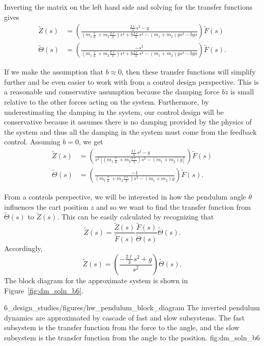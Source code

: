 %
Inverting the matrix on the left hand side and solving for the transfer functions gives
\begin{align*}
\tilde{Z}(s) &= \left(\frac{ \frac{2 \ell}{3} s^2 - g}{(m_1 \frac{\ell}{6}+ m_2 \frac{2 \ell}{3}) s^4 +b\frac{2\ell}{3} s^3 -(m_1+m_2)gs^2-bgs}\right) \tilde{F}(s) \\
\tilde{\Theta}(s) &= \left(\frac{-s^2}{(m_1 \frac{\ell}{6}+ m_2 \frac{2 \ell}{3}) s^4 +b\frac{2\ell}{3} s^3 -(m_1+m_2)gs^2-bgs}\right) \tilde{F}(s).
\end{align*}

If we make the assumption that $b \approx 0$, then these transfer functions will simplify further and be even easier to work with from a control design perspective. This is a reasonable and conservative assumption because the damping force $b\dot{z}$ is small relative to the other forces acting on the system. Furthermore, by underestimating the damping in the system, our control design will be conservative because it assumes there is no damping provided by the physics of the system and thus all the damping in the system must come from the feedback control.
%
Assuming $b=0$, we get
\begin{align*}
\tilde{Z}(s) &= \left(\frac{\frac{2 \ell}{3} s^2 - g}{s^2\left[(m_1 \frac{\ell}{6}+ m_2 \frac{2 \ell}{3}) s^2  -(m_1+m_2)g \right]}\right) \tilde{F}(s) \\
\tilde{\Theta}(s) &= \left(\frac{-1}{(m_1 \frac{\ell}{6}+ m_2 \frac{2 \ell}{3}) s^2  -(m_1+m_2)g}\right) \tilde{F}(s).
\end{align*}

From a controls perspective, we will be interested in how the pendulum angle $\theta$ influences the cart position $z$ and so we want to find the transfer function from $\tilde{\Theta}(s)$ to $\tilde{Z}(s)$. This can be easily calculated by recognizing that
\[
\tilde{Z}(s) = \frac{\tilde{Z}(s)}{\tilde{F}(s)}\frac{\tilde{F}(s)}{\tilde{\Theta}(s)} \tilde{\Theta}(s).
\]
Accordingly, 
\[
\tilde{Z}(s) = \left(\frac{-\frac{2 \ell}{3} s^2 + g}{s^2} \right) \tilde{\Theta}(s).
\]
%
The block diagram for the approximate system is shown in Figure~\ref{fig:dm_soln_b6}.

	{6_design_studies/figures/hw_pendulum_block_diagram}
	{The inverted pendulum dynamics are approximated by cascade of fast and slow subsystems.  The fast subsystem is the transfer function from the force to the angle, and the slow subsystem is the transfer function from the angle to the position.}
	{fig:dm_soln_b6}

